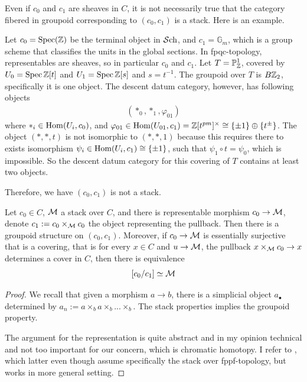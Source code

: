   \begin{remark}
    Even if $c_0$ and $c_1$ are sheaves in $C$, it is not necessarily true that the category fibered in groupoid corresponding to $(c_0, c_1)$ is a stack. Here is an example.

    Let $c_0=\operatorname{\mathrm{Spec}}(\mathbb{Z})$ be the terminal object in $\mathcal{S}\mathrm{ch}$, and $c_1=\mathbb{G}_m$, which is a group scheme that classifies the units in the global sections. In fpqc-topology, representables are sheaves, so in particular $c_0$ and $c_1$. 
    Let $T=\mathbb{P}_{\mathbb{Z}}^1$, covered by $U_0=\operatorname{\mathrm{Spec}}\mathbb{Z}[t]$ and $U_1=\operatorname{\mathrm{Spec}}\mathbb{Z}[s]$ and $s=t^{-1}$. The groupoid over $T$ is $B\mathbb{Z}_2$, specifically it is one object. The descent datum category, however, has following objects
    \begin{align*}
        (*_0, *_1, \varphi_{01})
    \end{align*}where $*_i \in \operatorname{Hom}(U_i, c_0)$, and $\varphi_{01}\in \operatorname{Hom}(U_{01}, c_1)=\mathbb{Z}[t^{pm}]^{\times}\cong \{\pm 1\}\oplus \{t^{\pm}\}$. The object $(*,*,t)$ is not isomorphic to $(*,*,1)$ because this requires there to exists isomorphism $\psi_i \in \operatorname{Hom}(U_i, c_1)\cong \{\pm 1\}$, such that $\psi_1\circ t=\psi_0$, which is impossible. So the descent datum category for this covering of $T$ contains at least two objects.

    Therefore, we have $(c_0,c_1)$ is not a stack.
  \end{remark}

   \begin{lemma}
    Let $c_0 \in C$, $\mathcal{M}$ a stack over $C$, and there is representable morphism $c_0\to \mathcal{M}$, denote $c_1:=c_0\times_{\mathcal{M}}c_0$ the object representing the pullback. Then there is a groupoid structure on $(c_0,c_1)$. Moreover, if $c_0\to \mathcal{M}$ is essentially surjective that is a covering, that is for every $x\in C$ and $u\to \mathcal{M}$, the pullback $x\times_{\mathcal{M}}c_0 \to x$ determines a cover in $C$, then there is equivalence
    \[
    [c_0/c_1]\simeq \mathcal{M}
    \]
   \end{lemma}
   \begin{proof}
    We recall that given a morphism $a\to b$, there is a simplicial object $a_\bullet$ determined by $a_n:=a\times_ba\times_b ...\times_b$. The stack properties implies the groupoid property.

    The argument for the representation is quite abstract and in my opinion technical and not too important for our concern, which is chromatic homotopy. I refer to \cite[Lemma 8.4.8, Lemma 94.16.1]{AGStacksProject}, which latter even though assume specifically the stack over fppf-topology, but works in more general setting.
   \end{proof}
   
